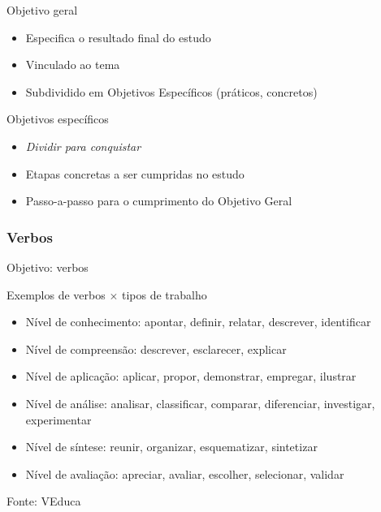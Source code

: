 \documentclass{beamer}
\begin{document}
\begin{frame}{Objetivo geral}
  \begin{itemize}
    \footnotesize
  \item Especifica o resultado final do estudo
    \bigskip
  \item Vinculado ao tema
    \bigskip
  \item Subdividido em Objetivos Específicos (práticos, concretos)
  \end{itemize}
\end{frame}

\begin{frame}{Objetivos específicos}
  \begin{itemize}
    \footnotesize
  \item {\em Dividir para conquistar}
    \bigskip
  \item Etapas concretas a ser cumpridas no estudo
    \bigskip
  \item Passo-a-passo para o cumprimento do Objetivo Geral
  \end{itemize}
\end{frame}

\subsubsection{Verbos}

\begin{frame}{Objetivo: verbos}
  \begin{exampleblock}{Exemplos de verbos $\times$ tipos de trabalho}
  \begin{itemize}
    \scriptsize
\item Nível de conhecimento: apontar, definir, relatar, descrever,
    identificar
  \item Nível de compreensão: descrever, esclarecer, explicar
  \item Nível de aplicação: aplicar, propor, demonstrar, empregar, ilustrar
  \item Nível de análise: analisar, classificar, comparar,
    diferenciar, investigar, experimentar
  \item Nível de síntese: reunir, organizar, esquematizar, sintetizar
  \item Nível de avaliação: apreciar, avaliar, escolher, selecionar, validar
  \end{itemize}
\end{exampleblock}
  \vfill
  \scriptsize
  Fonte: VEduca
\end{frame}
\end{document}
